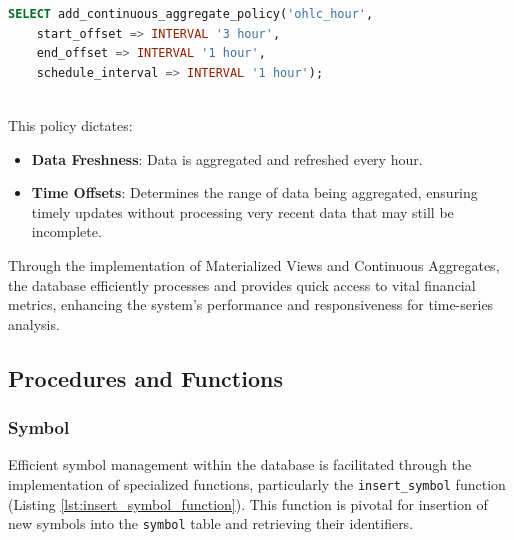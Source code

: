 \begin{lstlisting}[language=sql, caption=OHLC Continuous Aggregate Policy, label={lst:ohlc_hour_continuous_aggregate_policy}]
SELECT add_continuous_aggregate_policy('ohlc_hour',
    start_offset => INTERVAL '3 hour', 
    end_offset => INTERVAL '1 hour',
    schedule_interval => INTERVAL '1 hour');
\end{lstlisting}
\mbox{} \\
This policy dictates:
\begin{itemize}
\item \textbf{Data Freshness}: Data is aggregated and refreshed every hour.
\item \textbf{Time Offsets}: Determines the range of data being aggregated, ensuring timely updates without processing very recent data that may still be incomplete.
\end{itemize}

Through the implementation of Materialized Views and Continuous Aggregates, the database efficiently processes and provides quick access to vital financial metrics, enhancing the system's performance and responsiveness for time-series analysis.

\subsection{Procedures and Functions}
\subsubsection{Symbol}
Efficient symbol management within the database is facilitated through the implementation of specialized functions, particularly the \texttt{insert\_symbol} function (Listing \ref{lst:insert_symbol_function}). This function is pivotal for insertion of new symbols into the \texttt{symbol} table and retrieving their identifiers.

